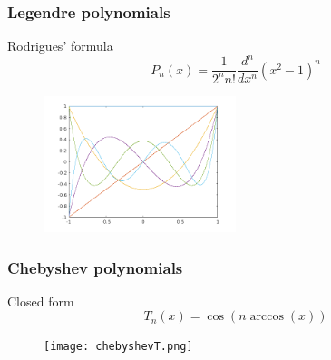 \documentclass{beamer}
\begin{document}
\begin{frame}

\frametitle{Legendre polynomials}

\begin{block}{Rodrigues' formula}
\begin{equation*}
P_n(x) = \frac{1}{2^n n!} \frac{d^n}{dx^n} (x^2-1)^n
\end{equation*}
\end{block}

\begin{figure}
\includegraphics[width=0.5\textwidth]{legendreP.png}
\end{figure}

\end{frame}

\begin{frame}

\frametitle{Chebyshev polynomials}

\begin{block}{Closed form}
\begin{equation*}
T_n(x) = \cos \left ( n \arccos \left ( x \right ) \right )
\end{equation*}
\end{block}

\begin{figure}
\texttt{[image: chebyshevT.png]}
\end{figure}

\end{frame}
\end{document}
